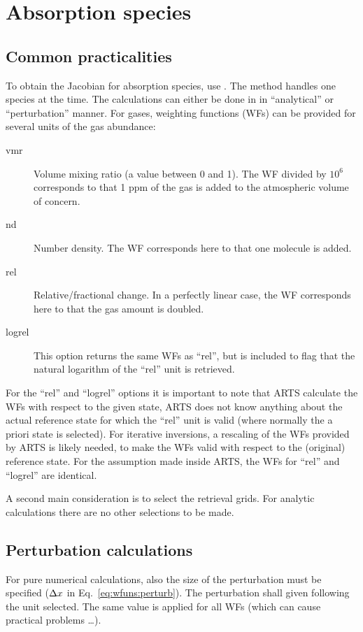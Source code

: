 \section{Absorption species}
\label{sec:wfuns:absspecies}

\subsection{Common practicalities}
%
To obtain the Jacobian for absorption species, use
. The method handles one species at the time.
The calculations can either be done in in ``analytical'' or ``perturbation''
manner. For gases, weighting functions (WFs) can be provided for several units
of the gas abundance:
\begin{description}
\item[vmr] Volume mixing ratio (a value between 0 and 1). The WF divided by
  $10^6$ corresponds to that 1 ppm of the gas is added to the atmospheric
  volume of concern.
\item[nd] Number density. The WF corresponds here to that one molecule is added.
\item[rel] Relative/fractional change. In a perfectly linear case, the WF
  corresponds here to that the gas amount is doubled.
\item[logrel] This option returns the same WFs as ``rel'', but is included to
  flag that the natural logarithm of the ``rel'' unit is retrieved.
\end{description}
For the ``rel'' and ``logrel'' options it is important to note that ARTS
calculate the WFs with respect to the given state, ARTS does not know anything
about the actual reference state for which the ``rel'' unit is valid (where
normally the a priori state is selected). For iterative inversions, a rescaling
of the WFs provided by ARTS is likely needed, to make the WFs valid with
respect to the (original) reference state. For the assumption made inside ARTS,
the WFs for ``rel'' and ``logrel'' are identical.

A second main consideration is to select the retrieval grids. For analytic
calculations there are no other selections to be made. 


\subsection{Perturbation calculations}
%
For pure numerical calculations, also the size of the perturbation must be
specified ($\Delta x$ in Eq.~\ref{eq:wfuns:perturb}). The perturbation
shall given following the unit selected. The same value is applied for all WFs
(which can cause practical problems \dots).


